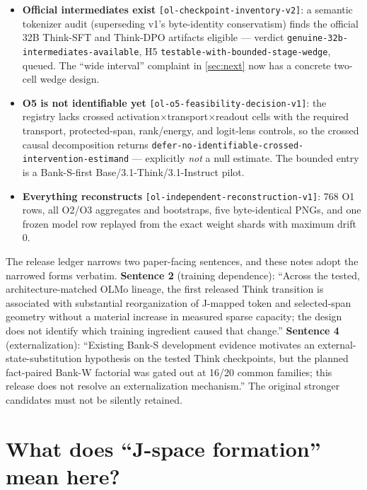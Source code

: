 \documentclass[11pt]{article}
\newcommand{\eid}[1]{{\footnotesize\nolinkurl{[#1]}}}
\begin{document}
\begin{itemize}
  \item \textbf{Official intermediates exist} \eid{ol-checkpoint-inventory-v2}:
  a semantic tokenizer audit (superseding v1's byte-identity conservatism)
  finds the official 32B Think-SFT and Think-DPO artifacts eligible ---
  verdict \texttt{genuine-32b-intermediates-available}, H5
  \texttt{testable-with-bounded-stage-wedge}, queued. The ``wide interval''
  complaint in \cref{sec:next} now has a concrete two-cell wedge design.
  \item \textbf{O5 is not identifiable yet} \eid{ol-o5-feasibility-decision-v1}:
  the registry lacks crossed activation$\times$transport$\times$readout cells
  with the required transport, protected-span, rank/energy, and logit-lens
  controls, so the crossed causal decomposition returns
  \texttt{defer-no-identifiable-crossed-intervention-estimand} --- explicitly
  \emph{not} a null estimate. The bounded entry is a Bank-S-first
  Base/3.1-Think/3.1-Instruct pilot.
  \item \textbf{Everything reconstructs} \eid{ol-independent-reconstruction-v1}:
  768 O1 rows, all O2/O3 aggregates and bootstraps, five byte-identical PNGs,
  and one frozen model row replayed from the exact weight shards with maximum
  drift 0.
\end{itemize}

\begin{warningbox}
The release ledger narrows two paper-facing sentences, and these notes adopt
the narrowed forms verbatim. \textbf{Sentence 2} (training dependence):
``Across the tested, architecture-matched OLMo lineage, the first released
Think transition is associated with substantial reorganization of J-mapped
token and selected-span geometry without a material increase in measured
sparse capacity; the design does not identify which training ingredient
caused that change.'' \textbf{Sentence 4} (externalization): ``Existing
Bank-S development evidence motivates an external-state-substitution
hypothesis on the tested Think checkpoints, but the planned fact-paired
Bank-W factorial was gated out at 16/20 common families; this release does
not resolve an externalization mechanism.'' The original stronger candidates
must not be silently retained.
\end{warningbox}

\section{What does ``J-space formation'' mean here?}\label{sec:formation}
\end{document}
